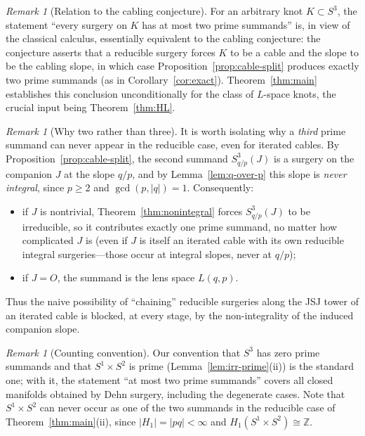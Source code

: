\documentclass[11pt]{article}
\theoremstyle{definition}
\theoremstyle{remark}
\newtheorem{remark}[theorem]{Remark}
\numberwithin{equation}{section}
\begin{document}
\begin{remark}[Relation to the cabling conjecture]
For an arbitrary knot $K\subset S^{3}$, the statement ``every surgery on
$K$ has at most two prime summands'' is, in view of the classical
calculus, essentially equivalent to the cabling conjecture: the
conjecture asserts that a reducible surgery forces $K$ to be a cable
and the slope to be the cabling slope, in which case
Proposition~\ref{prop:cable-split} produces exactly two prime summands
(as in Corollary~\ref{cor:exact}).  Theorem~\ref{thm:main} establishes
this conclusion unconditionally for the class of $L$-space knots, the
crucial input being Theorem~\ref{thm:HL}.
\end{remark}

\begin{remark}[Why two rather than three]
It is worth isolating why a \emph{third} prime summand can never appear
in the reducible case, even for iterated cables.  By
Proposition~\ref{prop:cable-split}, the second summand
$S^{3}_{q/p}(J)$ is a surgery on the companion $J$ at the slope
$q/p$, and by Lemma~\ref{lem:q-over-p} this slope is \emph{never
integral}, since $p\ge2$ and $\gcd(p,|q|)=1$.  Consequently:
\begin{itemize}
\item if $J$ is nontrivial, Theorem~\ref{thm:nonintegral} forces
$S^{3}_{q/p}(J)$ to be irreducible, so it contributes exactly one prime
summand, no matter how complicated $J$ is (even if $J$ is itself an
iterated cable with its own reducible integral surgeries---those occur at
integral slopes, never at $q/p$);
\item if $J=O$, the summand is the lens space $L(q,p)$.
\end{itemize}
Thus the naive possibility of ``chaining'' reducible surgeries along the
JSJ tower of an iterated cable is blocked, at every stage, by the
non-integrality of the induced companion slope.
\end{remark}

\begin{remark}[Counting convention]
Our convention that $S^{3}$ has zero prime summands and that
$S^{1}\times S^{2}$ is prime (Lemma~\ref{lem:irr-prime}(ii)) is the
standard one; with it, the statement ``at most two prime summands''
covers all closed manifolds obtained by Dehn surgery, including the
degenerate cases.  Note that $S^{1}\times S^{2}$ can never occur as one of
the two summands in the reducible case of
Theorem~\ref{thm:main}(ii), since $|H_{1}|=|pq|<\infty$ and
$H_{1}(S^{1}\times S^{2})\cong\mathbb{Z}$.
\end{remark}
\end{document}
